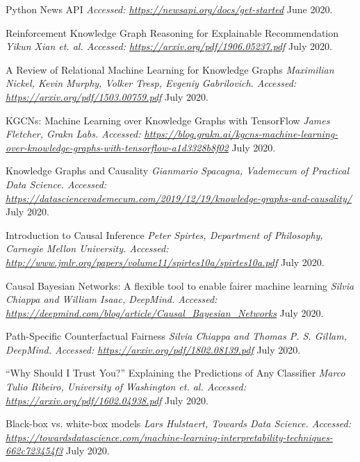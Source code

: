 \begin{thebibliography}{1}
 Python News API {\em Accessed:  \url{https://newsapi.org/docs/get-started}} June 2020.

Reinforcement Knowledge Graph Reasoning for Explainable Recommendation
{\em Yikun Xian et. al. Accessed:  \url{https://arxiv.org/pdf/1906.05237.pdf}} July 2020.

A Review of Relational Machine Learning for Knowledge Graphs
{\em Maximilian Nickel, Kevin Murphy, Volker Tresp, Evgeniy Gabrilovich. Accessed:  \url{https://arxiv.org/pdf/1503.00759.pdf}} July 2020.

KGCNs: Machine Learning over Knowledge Graphs with TensorFlow
{\em James Fletcher, Grakn Labs. Accessed:  \url{https://blog.grakn.ai/kgcns-machine-learning-over-knowledge-graphs-with-tensorflow-a1d3328b8f02}} July 2020.

Knowledge Graphs and Causality
{\em Gianmario Spacagna, Vademecum of Practical Data Science. Accessed:  \url{https://datasciencevademecum.com/2019/12/19/knowledge-graphs-and-causality/}} July 2020.

Introduction to Causal Inference
{\em Peter Spirtes, Department of Philosophy, Carnegie Mellon University. Accessed:  \url{http://www.jmlr.org/papers/volume11/spirtes10a/spirtes10a.pdf}} July 2020.

Causal Bayesian Networks: A flexible tool to enable fairer machine learning
{\em Silvia Chiappa and William Isaac, DeepMind. Accessed:  \url{https://deepmind.com/blog/article/Causal_Bayesian_Networks}} July 2020.

Path-Specific Counterfactual Fairness
{\em Silvia Chiappa and Thomas P. S. Gillam, DeepMind. Accessed:  \url{https://arxiv.org/pdf/1802.08139.pdf}} July 2020.

“Why Should I Trust You?” Explaining the Predictions of Any Classifier
{\em Marco Tulio Ribeiro, University of Washington et. al. Accessed:  \url{https://arxiv.org/pdf/1602.04938.pdf}} July 2020.

Black-box vs. white-box models
{\em Lars Hulstaert, Towards Data Science. Accessed:  \url{https://towardsdatascience.com/machine-learning-interpretability-techniques-662c723454f3}} July 2020.

\end{thebibliography}